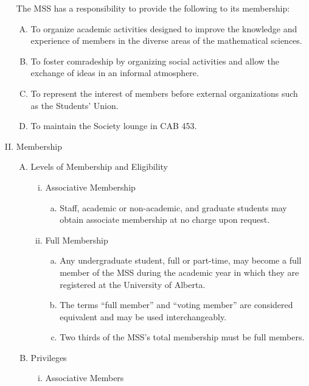 \documentclass[11pt]{article}
\begin{document}
\begin{enumerate}[I.]
    The MSS has a responsibility to provide the following to its membership:
    \begin{enumerate}[A)]
      \item To organize academic activities designed to improve the knowledge
        and experience of members in the diverse areas of the mathematical
        sciences. 
      \item To foster comradeship by organizing social activities and allow the
        exchange of ideas in an informal atmosphere. 
      \item To represent the interest of members before external organizations
        such as the Students' Union. 
      \item To maintain the Society lounge in CAB 453.
    \end{enumerate}
  \item Membership
    \begin{enumerate}[A)]
      \item Levels of Membership and Eligibility
        \begin{enumerate}[i)]
          \item Associative Membership
            \begin{enumerate}[a)]
              \item Staff, academic or non-academic, and graduate students may
                obtain associate membership at no charge upon request. 
            \end{enumerate}
          \item Full Membership
          \begin{enumerate}[a)]
              \item Any undergraduate student, full or part-time, may become a
                full member of the MSS during the academic year in which they
                are registered at the University of Alberta.
              \item The terms ``full member'' and ``voting member'' are
                considered equivalent and may be used interchangeably. 
              \item Two thirds of the MSS's total membership must be full
                members.
            \end{enumerate}
        \end{enumerate}
      \item Privileges
        \begin{enumerate}[i)]
          \item Associative Members

\end{enumerate}
\end{enumerate}
\end{enumerate}
\end{document}
